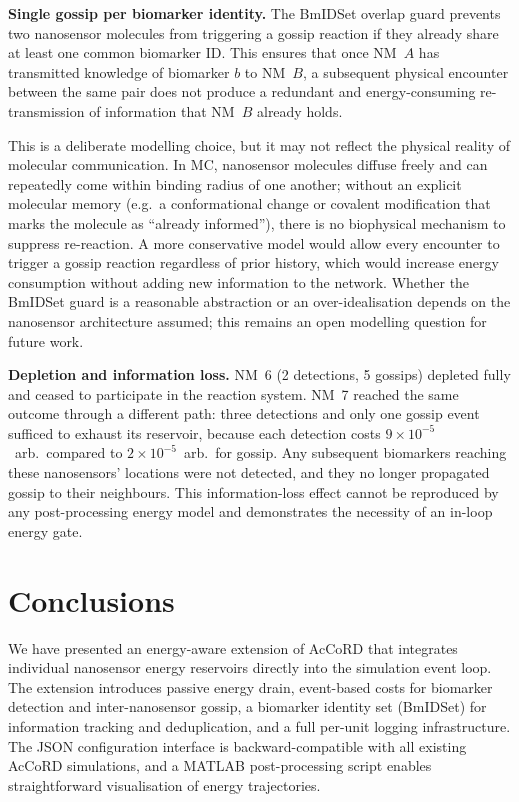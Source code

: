 \documentclass[journal]{IEEEtran}
\begin{document}
\textbf{Single gossip per biomarker identity.}
The BmIDSet overlap guard prevents two nanosensor molecules from triggering a
gossip reaction if they already share at least one common biomarker ID. This
ensures that once NM~$A$ has transmitted knowledge of biomarker $b$ to NM~$B$,
a subsequent physical encounter between the same pair does not produce a
redundant and energy-consuming re-transmission of information that
NM~$B$ already holds.

This is a deliberate modelling choice, but it may not reflect the physical
reality of molecular communication. In MC, nanosensor molecules diffuse
freely and can repeatedly come within binding radius of one another; without
an explicit molecular memory (e.g.\ a conformational change or covalent
modification that marks the molecule as ``already informed''), there is no
biophysical mechanism to suppress re-reaction. A more conservative model
would allow every encounter to trigger a gossip reaction regardless of
prior history, which would increase energy consumption without adding new
information to the network. Whether the BmIDSet guard is a reasonable
abstraction or an over-idealisation depends on the nanosensor architecture
assumed; this remains an open modelling question for future work.

\textbf{Depletion and information loss.}
NM~6 (2 detections, 5 gossips) depleted fully and ceased to participate in the
reaction system. NM~7 reached the same outcome through a different path: three
detections and only one gossip event sufficed to exhaust its reservoir, because
each detection costs $9\times10^{-5}$~arb.\ compared to $2\times10^{-5}$~arb.\
for gossip. Any subsequent biomarkers reaching these nanosensors' locations were
not detected, and they no longer propagated gossip to their neighbours. This
information-loss effect cannot be reproduced by any post-processing energy model
and demonstrates the necessity of an in-loop energy gate.

\section{Conclusions}
\label{sec:conclusions}

We have presented an energy-aware extension of AcCoRD that integrates
individual nanosensor energy reservoirs directly into the simulation event loop.
The extension introduces passive energy drain, event-based costs for biomarker
detection and inter-nanosensor gossip, a biomarker identity set (BmIDSet) for
information tracking and deduplication, and a full per-unit logging
infrastructure. The JSON configuration interface is backward-compatible with
all existing AcCoRD simulations, and a MATLAB post-processing script enables
straightforward visualisation of energy trajectories.
\end{document}
